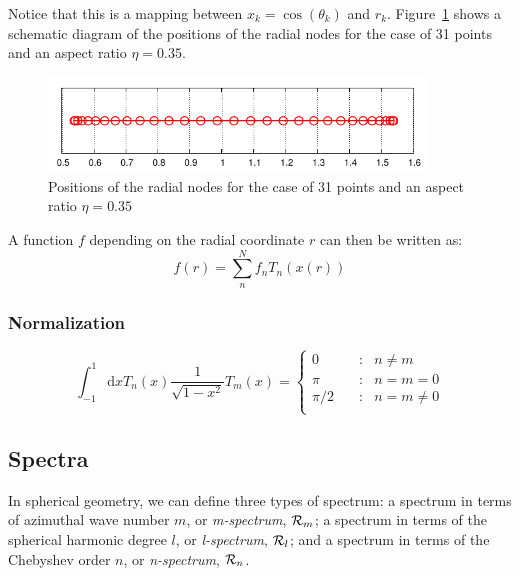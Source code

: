 \documentclass[a4paper,10pt]{book}
\begin{document}
Notice that this is a mapping between $x_k=\cos(\theta_k)$ and $r_k$.
Figure~\ref{f:radialNodes} shows a schematic diagram of the positions of the
radial nodes for the case of 31 points and an aspect ratio $\eta=0.35$.
\begin{figure}[htb]
\centering \includegraphics[width=0.9\textwidth]{figs/radialPoints}
 \caption{Positions of the radial nodes for the case of 31 points and an aspect
ratio $\eta=0.35$}
 \label{f:radialNodes}
\end{figure}

A function $f$ depending on the radial coordinate $r$ can then be written as:
\begin{equation}
 f(r) = \sum_n^N f_n T_n(x(r))
\end{equation}

\subsubsection{Normalization}
\begin{equation}
 \int_{-1}^{1} \mbox{d}x T_n(x)\frac{1}{\sqrt{1-x^2}}T_m(x) =
 \left\{
\begin{array}{lcl}
 0 &:& n \ne m \\
 \pi &:& n = m = 0\\
 \pi/2 \quad &:& n = m \ne 0\\
\end{array}
\right.
\end{equation}


\subsection{Spectra}
\label{s:spectra_defs}
In spherical geometry, we can define three types of spectrum: a spectrum in
terms of azimuthal wave number $m$, or {\em m-spectrum}, ${\cal R}_m$; a
spectrum in terms of the spherical harmonic degree $l$, or {\em l-spectrum},
${\cal R}_l$; and a spectrum in terms of the Chebyshev order $n$, or
{\em n-spectrum}, ${\cal R}_n$.
\end{document}
